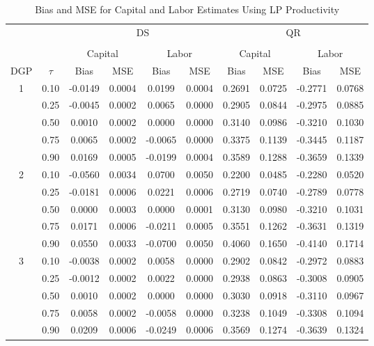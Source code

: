 \begin{table}[ht]
\centering
\caption{Bias and MSE for Capital and Labor Estimates Using LP Productivity} 
\begin{tabular}{cccccccccc}
  \hline\hline & & & \multicolumn{2}{c}{DS} & & & \multicolumn{2}{c}{QR} \\ \cmidrule(lr){3-6} \cmidrule(lr){7-10} \\ & & \multicolumn{2}{c}{Capital} & \multicolumn{2}{c}{Labor} & \multicolumn{2}{c}{Capital} & \multicolumn{2}{c}{Labor} \\ \cmidrule(lr){3-4} \cmidrule(lr){5-6} \cmidrule(lr){7-8} \cmidrule(lr){9-10}DGP & $\tau$ & Bias & MSE & Bias & MSE & Bias & MSE & Bias & MSE \\ 
  \hline
1 & 0.10 & -0.0149 & 0.0004 & 0.0199 & 0.0004 & 0.2691 & 0.0725 & -0.2771 & 0.0768 \\ 
   & 0.25 & -0.0045 & 0.0002 & 0.0065 & 0.0000 & 0.2905 & 0.0844 & -0.2975 & 0.0885 \\ 
   & 0.50 & 0.0010 & 0.0002 & 0.0000 & 0.0000 & 0.3140 & 0.0986 & -0.3210 & 0.1030 \\ 
   & 0.75 & 0.0065 & 0.0002 & -0.0065 & 0.0000 & 0.3375 & 0.1139 & -0.3445 & 0.1187 \\ 
   & 0.90 & 0.0169 & 0.0005 & -0.0199 & 0.0004 & 0.3589 & 0.1288 & -0.3659 & 0.1339 \\ 
  2 & 0.10 & -0.0560 & 0.0034 & 0.0700 & 0.0050 & 0.2200 & 0.0485 & -0.2280 & 0.0520 \\ 
   & 0.25 & -0.0181 & 0.0006 & 0.0221 & 0.0006 & 0.2719 & 0.0740 & -0.2789 & 0.0778 \\ 
   & 0.50 & 0.0000 & 0.0003 & 0.0000 & 0.0001 & 0.3130 & 0.0980 & -0.3210 & 0.1031 \\ 
   & 0.75 & 0.0171 & 0.0006 & -0.0211 & 0.0005 & 0.3551 & 0.1262 & -0.3631 & 0.1319 \\ 
   & 0.90 & 0.0550 & 0.0033 & -0.0700 & 0.0050 & 0.4060 & 0.1650 & -0.4140 & 0.1714 \\ 
  3 & 0.10 & -0.0038 & 0.0002 & 0.0058 & 0.0000 & 0.2902 & 0.0842 & -0.2972 & 0.0883 \\ 
   & 0.25 & -0.0012 & 0.0002 & 0.0022 & 0.0000 & 0.2938 & 0.0863 & -0.3008 & 0.0905 \\ 
   & 0.50 & 0.0010 & 0.0002 & 0.0000 & 0.0000 & 0.3030 & 0.0918 & -0.3110 & 0.0967 \\ 
   & 0.75 & 0.0058 & 0.0002 & -0.0058 & 0.0000 & 0.3238 & 0.1049 & -0.3308 & 0.1094 \\ 
   & 0.90 & 0.0209 & 0.0006 & -0.0249 & 0.0006 & 0.3569 & 0.1274 & -0.3639 & 0.1324 \\ 
   \hline
\end{tabular}
\end{table}
